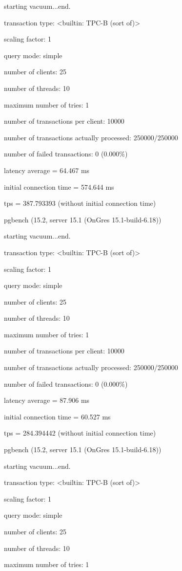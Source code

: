 starting vacuum...end.

transaction type: <builtin: TPC-B (sort of)>

scaling factor: 1

query mode: simple

number of clients: 25

number of threads: 10

maximum number of tries: 1

number of transactions per client: 10000

number of transactions actually processed: 250000/250000

number of failed transactions: 0 (0.000\%)

latency average = 64.467 ms

initial connection time = 574.644 ms

tps = 387.793393 (without initial connection time)


pgbench (15.2, server 15.1 (OnGres 15.1-build-6.18))

starting vacuum...end.

transaction type: <builtin: TPC-B (sort of)>

scaling factor: 1

query mode: simple

number of clients: 25

number of threads: 10

maximum number of tries: 1

number of transactions per client: 10000

number of transactions actually processed: 250000/250000

number of failed transactions: 0 (0.000\%)

latency average = 87.906 ms

initial connection time = 60.527 ms

tps = 284.394442 (without initial connection time)

pgbench (15.2, server 15.1 (OnGres 15.1-build-6.18))

starting vacuum...end.

transaction type: <builtin: TPC-B (sort of)>

scaling factor: 1

query mode: simple

number of clients: 25

number of threads: 10

maximum number of tries: 1

